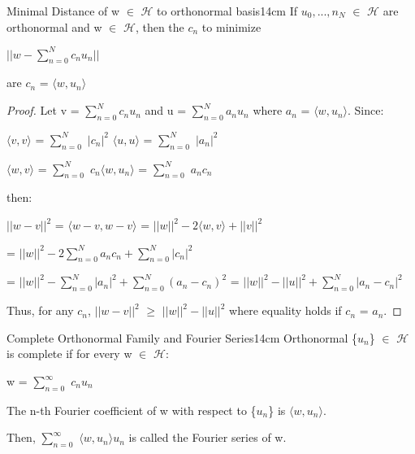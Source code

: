     \vspace{0.5cm}



    \begin{wtheorem}{Minimal Distance of w $\in$ $\mathcal{H}$
    to orthonormal basis}{14cm}
        If $u_0,...,n_N$ $\in$ $\mathcal{H}$ are orthonormal
        and w $\in$ $\mathcal{H}$, then the $c_n$ to minimize

        \hspace{0.5cm}
        $|| w - \sum_{n=0}^N c_nu_n ||$

        are $c_n$ = $\langle w , u_n \rangle$
    \end{wtheorem}

    \begin{proof}
        Let v = $\sum_{n=0}^N c_nu_n$ and u = $\sum_{n=0}^N a_nu_n$
        where $a_n$ = $\langle w , u_n \rangle$. Since:

        \hspace{0.5cm}
        $\langle v , v \rangle$
        = $\sum_{n=0}^N$ $|c_n|^2$
        \hspace{1cm}
        $\langle u , u \rangle$
        = $\sum_{n=0}^N$ $|a_n|^2$

        \hspace{0.5cm}
        $\langle w , v \rangle$
        = $\sum_{n=0}^N$ $c_n \langle w , u_n \rangle$
        = $\sum_{n=0}^N$ $a_nc_n$

        then:

        \hspace{0.5cm}
        $||w-v||^2$
        = $\langle w-v , w-v \rangle$
        = $||w||^2 - 2 \langle w , v \rangle + ||v||^2$

        \hspace{2.3cm}
        = $||w||^2 - 2 \sum_{n=0}^N a_nc_n + \sum_{n=0}^N |c_n|^2$
        
        \hspace{2.3cm}
        = $||w||^2 - \sum_{n=0}^N |a_n|^2 + \sum_{n=0}^N (a_n-c_n)^2$
        = $||w||^2 - ||u||^2 + \sum_{n=0}^N |a_n-c_n|^2$

        Thus, for any $c_n$,
        $||w-v||^2$
        $\geq$ $||w||^2 - ||u||^2$
        where equality holds if $c_n$ = $a_n$.
    \end{proof}

    \vspace{0.5cm}



    \begin{definition}{Complete Orthonormal Family and Fourier Series}{14cm}
        Orthonormal \{$u_n$\} $\in$ $\mathcal{H}$ is {\color{lblue} complete}
        if for every w $\in$ $\mathcal{H}$:

        \hspace{0.5cm}
        w = $\sum_{n=0}^{\infty}$ $c_n u_n$

        The n-th Fourier coefficient of w with respect to \{$u_n$\}
        is $\langle w , u_n \rangle$.

        Then, $\sum_{n=0}^{\infty}$ $\langle w , u_n \rangle u_n$
        is called the {\color{lblue} Fourier series of w}.
    \end{definition}

